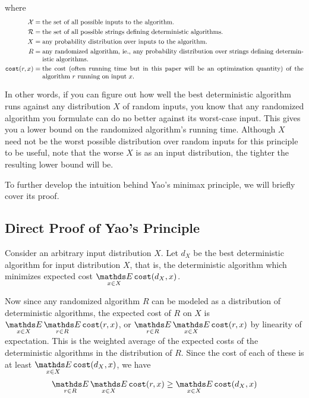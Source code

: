 where \begin{align*}
\mathcal{X} =&\; \text{the set of all possible inputs to the algorithm.}
\\
\mathcal{R} =&\; \text{the set of all possible strings defining deterministic algorithms.}
\\
X =&\; \text{any probability distribution over inputs to the algorithm.}
\\
R =&\; \text{\parbox[t]{5.5in}{any randomized algorithm, ie., any probability distribution over strings defining deterministic algorithms.}}
\\
\texttt{cost}(r, x) =&\; \text{\parbox[t]{5.5in}{the cost (often running time but in this paper will be an optimization quantity) of the algorithm $r$ running on input $x$.}}
\end{align*}

In other words, if you can figure out how well the best deterministic algorithm runs against any distribution $X$ of random inputs, you know that any randomized algorithm you formulate can do no better against its worst-case input. This gives you a lower bound on the randomized algorithm's running time.
Although $X$ need not be the worst possible distribution over random inputs for this principle to be useful, note that the worse $X$ is as an input distribution, the tighter the resulting lower bound will be. 

To further develop the intuition behind Yao's minimax principle, we will briefly cover its proof.

\subsection{Direct Proof of Yao's Principle}

Consider an arbitrary input distribution $X$. Let $d_X$ be the best deterministic algorithm for input distribution $X$, that is, the deterministic algorithm which minimizes expected cost $\Expected_{x\in X}\texttt{cost}(d_X,x)$.

Now since any randomized algorithm $R$ can be modeled as a distribution of deterministic algorithms, the expected cost of $R$ on $X$ is $\Expected_{x\in X}\Expected_{r\in R}\texttt{cost}(r,x)$, or $\Expected_{r\in R}\Expected_{x\in X}\texttt{cost}(r,x)$ by linearity of expectation. This is the weighted average of the expected costs of the deterministic algorithms in the distribution of $R$. Since the cost of each of these is at least $\Expected_{x\in X}\texttt{cost}(d_X,x)$, we have
\[\Expected_{r\in R}\Expected_{x\in X}\texttt{cost}(r,x) \ge \Expected_{x\in X}\texttt{cost}(d_X,x)\]


